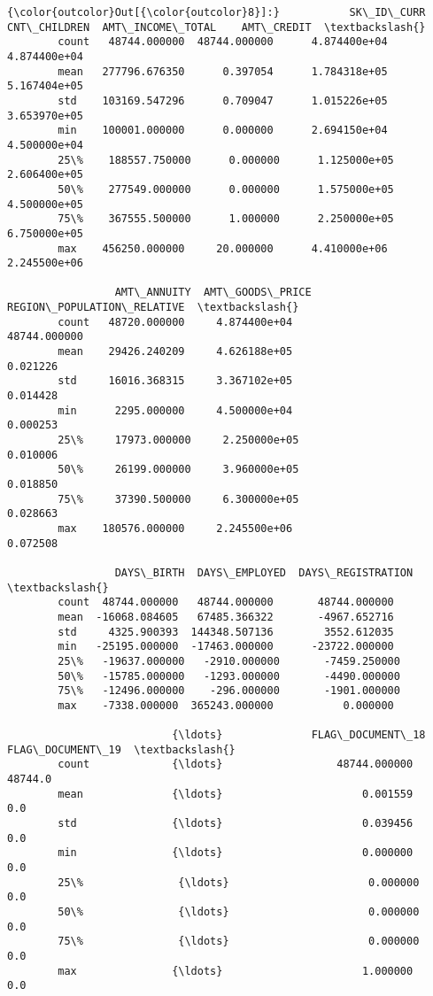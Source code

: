 \documentclass[11pt]{article}
\begin{document}
\begin{Verbatim}[commandchars=\\\{\}]
{\color{outcolor}Out[{\color{outcolor}8}]:}           SK\_ID\_CURR  CNT\_CHILDREN  AMT\_INCOME\_TOTAL    AMT\_CREDIT  \textbackslash{}
        count   48744.000000  48744.000000      4.874400e+04  4.874400e+04   
        mean   277796.676350      0.397054      1.784318e+05  5.167404e+05   
        std    103169.547296      0.709047      1.015226e+05  3.653970e+05   
        min    100001.000000      0.000000      2.694150e+04  4.500000e+04   
        25\%    188557.750000      0.000000      1.125000e+05  2.606400e+05   
        50\%    277549.000000      0.000000      1.575000e+05  4.500000e+05   
        75\%    367555.500000      1.000000      2.250000e+05  6.750000e+05   
        max    456250.000000     20.000000      4.410000e+06  2.245500e+06   
        
                 AMT\_ANNUITY  AMT\_GOODS\_PRICE  REGION\_POPULATION\_RELATIVE  \textbackslash{}
        count   48720.000000     4.874400e+04                48744.000000   
        mean    29426.240209     4.626188e+05                    0.021226   
        std     16016.368315     3.367102e+05                    0.014428   
        min      2295.000000     4.500000e+04                    0.000253   
        25\%     17973.000000     2.250000e+05                    0.010006   
        50\%     26199.000000     3.960000e+05                    0.018850   
        75\%     37390.500000     6.300000e+05                    0.028663   
        max    180576.000000     2.245500e+06                    0.072508   
        
                 DAYS\_BIRTH  DAYS\_EMPLOYED  DAYS\_REGISTRATION  \textbackslash{}
        count  48744.000000   48744.000000       48744.000000   
        mean  -16068.084605   67485.366322       -4967.652716   
        std     4325.900393  144348.507136        3552.612035   
        min   -25195.000000  -17463.000000      -23722.000000   
        25\%   -19637.000000   -2910.000000       -7459.250000   
        50\%   -15785.000000   -1293.000000       -4490.000000   
        75\%   -12496.000000    -296.000000       -1901.000000   
        max    -7338.000000  365243.000000           0.000000   
        
                          {\ldots}              FLAG\_DOCUMENT\_18  FLAG\_DOCUMENT\_19  \textbackslash{}
        count             {\ldots}                  48744.000000           48744.0   
        mean              {\ldots}                      0.001559               0.0   
        std               {\ldots}                      0.039456               0.0   
        min               {\ldots}                      0.000000               0.0   
        25\%               {\ldots}                      0.000000               0.0   
        50\%               {\ldots}                      0.000000               0.0   
        75\%               {\ldots}                      0.000000               0.0   
        max               {\ldots}                      1.000000               0.0   
        

\end{Verbatim}
\end{document}
